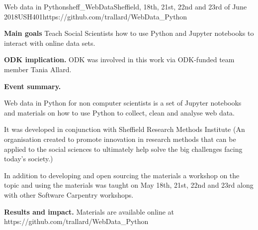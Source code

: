 \begin{event}{Web data in Python}{sheff_WebData}{Sheffield, 18th, 21st, 22nd and 23rd of June 2018}{USH}{40}{1}{https://github.com/trallard/WebData_Python}

\textbf{Main goals} Teach Social Scientists how to use Python and Jupyter notebooks to interact with online data sets.

\textbf{ODK implication.} ODK was involved in this work via ODK-funded team member Tania Allard.

\textbf{Event summary.}

Web data in Python for non computer scientists is a set of Jupyter notebooks and materials on how to use Python to collect, clean and analyse web data.

 It was developed in conjunction with Sheffield Research Methods Institute (An organisation created to promote innovation in research methods that can be applied to the social sciences to ultimately help solve the big challenges facing today’s society.)

In addition to developing and open sourcing the materials a workshop on the topic and using the materials was taught on May 18th, 21st, 22nd and 23rd along with other Software Carpentry workshops.

\textbf{Results and impact.} Materials are available online at https://github.com/trallard/WebData_Python

\end{event}
